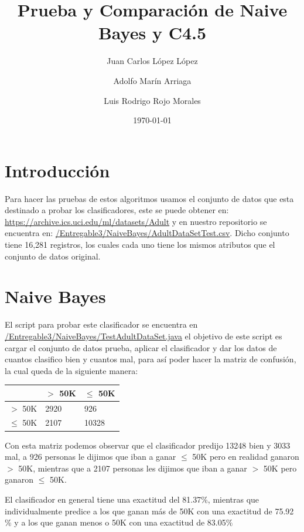 \documentclass{article}
\title{Prueba y Comparación de Naive Bayes y C4.5}
\author{Juan Carlos López López \and Adolfo Marín Arriaga \and Luis Rodrigo Rojo Morales}
\date{\today\\}
\begin{document}
 \maketitle
 \section{Introducción}
 Para hacer las pruebas de estos algoritmos usamos el conjunto de datos que esta destinado a probar los clasificadores, este se puede obtener en: \href{https://archive.ics.uci.edu/ml/datasets/Adult} {https://archive.ics.uci.edu/ml/datasets/Adult} y en nuestro repositorio se encuentra en: \href{https://github.com/rodrigorojo/ProyectoFinalMineria/blob/master/Entregable3/NaiveBayes/AdultDataSetTest.csv}{/Entregable3/NaiveBayes/AdultDataSetTest.csv}. Dicho conjunto tiene 16,281 registros, los cuales cada uno tiene los mismos atributos que el conjunto de datos original.

 \section{Naive Bayes}
 El script para probar este clasificador se encuentra en \href{https://github.com/rodrigorojo/ProyectoFinalMineria/blob/master/Entregable3/NaiveBayes/TestAdultDataSet.java} {/Entregable3/NaiveBayes/TestAdultDataSet.java} el objetivo de este script es cargar el conjunto de datos prueba, aplicar el clasificador y dar los datos de cuantos clasifico bien y cuantos mal, para así poder hacer la matriz de confusión, la cual queda de la siguiente manera:
 \begin{center}
   \begin{tabular}{|p{2cm}|p{2cm}|p{2cm}|}
     \hline
                  & $>$ 50K & $\leq$ 50K  \\ \hline
      $>$ 50K     & 2920    & 926         \\ \hline
      $\leq$ 50K  & 2107    & 10328        \\ \hline
    \end{tabular}
 \end{center}
 Con esta matriz podemos observar que el clasificador predijo 13248 bien y 3033 mal, a 926 personas le dijimos que iban a ganar $\leq$ 50K pero en realidad ganaron $>$ 50K, mientras que a 2107 personas les dijimos que iban a ganar $>$ 50K pero ganaron $\leq$ 50K.

 El clasificador en general tiene una exactitud del 81.37$\%$, mientras que individualmente predice a los que ganan más de 50K con una exactitud de 75.92$\%$ y a los que ganan menos o 50K con una exactitud de 83.05$\%$
\end{document}
